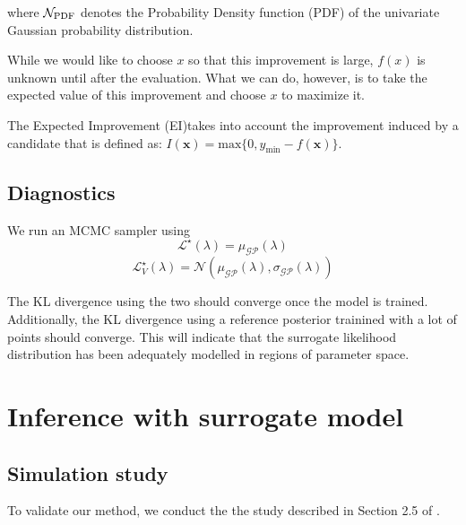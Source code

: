 \documentclass[twocolumn]{aastex631}
\begin{document}
where $\mathcal{N}_{\rm PDF}$ denotes the Probability Density function (PDF) of the univariate Gaussian probability distribution.

While we would like to choose $x$ so that this improvement is large, $f(x)$ is unknown until after the evaluation.  What we can do, however, 
is to take the expected value of this improvement and choose $x$ to maximize it.

The Expected Improvement (EI)takes into account the improvement induced by a candidate that is defined as: $I(\textbf{x})=\text{max}\{0,y_{\text{min}}-f(\textbf{x})\}$. 












\subsection{Diagnostics}

We run an MCMC sampler using
\begin{equation}
    \mathcal{L}^{\star}(\lambda) = \mu_{\mathcal{GP}}(\lambda)
\end{equation}
\begin{equation}
    \mathcal{L}^{\star}_{V}(\lambda) = \mathcal{N}(\mu_{\mathcal{GP}}(\lambda), \sigma_{\mathcal{GP}}(\lambda))
\end{equation}


The KL divergence using the two \Lsurr should converge once the model is trained. 
Additionally, the KL divergence using a reference posterior trainined with a lot of points should converge.
This will indicate that the surrogate likelihood distribution has been adequately modelled in regions of parameter space. 


\section{Inference with surrogate model}
\label{sec:results}
\subsection{Simulation study}

To validate our method, we conduct the the study described in Section 2.5 of \citep{Riley:2023:ApJ}.
\end{document}
